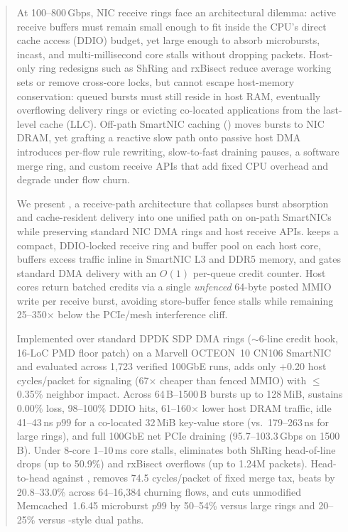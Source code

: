 \begin{abstract}
At 100--800\,Gbps, NIC receive rings face an architectural dilemma: active
receive buffers must remain small enough to fit inside the CPU's direct cache
access (DDIO) budget, yet large enough to absorb microbursts, incast, and
multi-millisecond core stalls without dropping packets. Host-only ring
redesigns such as ShRing and rxBisect reduce average working sets or remove
cross-core locks, but cannot escape host-memory conservation: queued bursts
must still reside in host RAM, eventually overflowing delivery rings or
evicting co-located applications from the last-level cache (LLC). Off-path
SmartNIC caching (\ceio{}) moves bursts to NIC DRAM, yet grafting a reactive
slow path onto passive host DMA introduces per-flow rule rewriting,
slow-to-fast draining pauses, a software merge ring, and custom receive APIs
that add fixed CPU overhead and degrade under flow churn.

We present \sys{}, a receive-path architecture that collapses burst absorption
and cache-resident delivery into one unified path on on-path SmartNICs while
preserving standard NIC DMA rings and host receive APIs. \sys{} keeps a compact,
DDIO-locked receive ring and buffer pool on
each host core, buffers excess traffic inline in SmartNIC L3 and DDR5 memory,
and gates standard DMA delivery with an $O(1)$ per-queue credit counter. Host
cores return batched credits via a single \emph{unfenced} 64-byte posted MMIO
write per receive burst, avoiding store-buffer fence stalls while remaining
25--350$\times$ below the PCIe/mesh interference cliff.

Implemented over standard DPDK SDP DMA rings ($\sim$6-line credit hook, 16-LoC
PMD floor patch) on a Marvell OCTEON~10 CN106 SmartNIC and evaluated across
1,723 verified 100GbE runs, \sys{} adds only
+0.20 host cycles/packet for signaling (67$\times$ cheaper than fenced MMIO)
with $\le$0.35\% neighbor impact. Across 64\,B--1500\,B bursts up to 128\,MiB, \sys{}
sustains 0.00\% loss, 98--100\% DDIO hits, 61--160$\times$ lower host DRAM
traffic, idle 41--43\,ns $p99$ for a co-located 32\,MiB key-value store (vs.\
179--263\,ns for large rings), and full 100GbE net PCIe draining (95.7--103.3\,Gbps
on 1500\,B). Under 8-core 1--10\,ms core stalls, \sys{} eliminates both ShRing
head-of-line drops (up to 50.9\%) and rxBisect overflows (up to 1.24M packets).
Head-to-head against \ceio{}, \sys{} removes 74.5 cycles/packet of fixed merge
tax, beats \ceio{} by 20.8--33.0\% across 64--16,384 churning flows, and cuts
unmodified Memcached~1.6.45 microburst $p99$ by 50--54\% versus large rings and
20--25\% versus \ceio{}-style dual paths.
\end{abstract}
